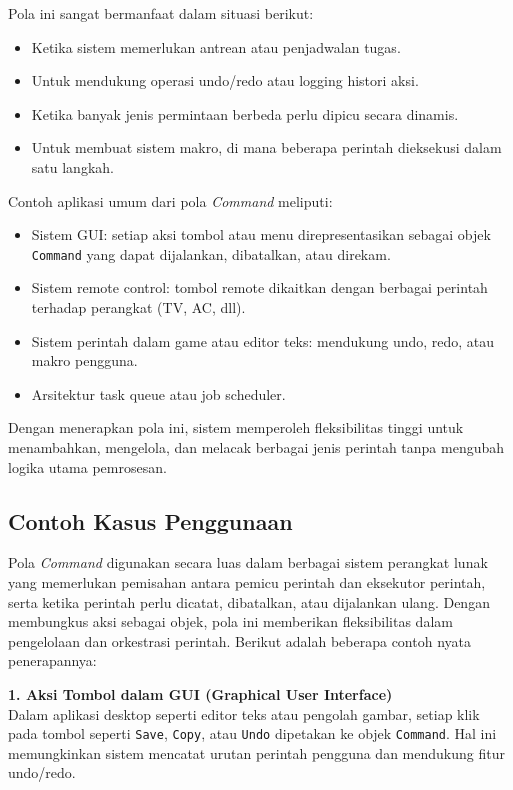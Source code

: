 Pola ini sangat bermanfaat dalam situasi berikut:
\begin{itemize}
	\item Ketika sistem memerlukan antrean atau penjadwalan tugas.
	\item Untuk mendukung operasi undo/redo atau logging histori aksi.
	\item Ketika banyak jenis permintaan berbeda perlu dipicu secara dinamis.
	\item Untuk membuat sistem makro, di mana beberapa perintah dieksekusi dalam satu langkah.
\end{itemize}

Contoh aplikasi umum dari pola \textit{Command} meliputi:
\begin{itemize}
	\item Sistem GUI: setiap aksi tombol atau menu direpresentasikan sebagai objek \texttt{Command} yang dapat dijalankan, dibatalkan, atau direkam.
	\item Sistem remote control: tombol remote dikaitkan dengan berbagai perintah terhadap perangkat (TV, AC, dll).
	\item Sistem perintah dalam game atau editor teks: mendukung undo, redo, atau makro pengguna.
	\item Arsitektur task queue atau job scheduler.
\end{itemize}

Dengan menerapkan pola ini, sistem memperoleh fleksibilitas tinggi untuk menambahkan, mengelola, dan melacak berbagai jenis perintah tanpa mengubah logika utama pemrosesan.

\subsection{Contoh Kasus Penggunaan}

Pola \textit{Command} digunakan secara luas dalam berbagai sistem perangkat lunak yang memerlukan pemisahan antara pemicu perintah dan eksekutor perintah, serta ketika perintah perlu dicatat, dibatalkan, atau dijalankan ulang. Dengan membungkus aksi sebagai objek, pola ini memberikan fleksibilitas dalam pengelolaan dan orkestrasi perintah. Berikut adalah beberapa contoh nyata penerapannya:

\textbf{1. Aksi Tombol dalam GUI (Graphical User Interface)} \\
Dalam aplikasi desktop seperti editor teks atau pengolah gambar, setiap klik pada tombol seperti \texttt{Save}, \texttt{Copy}, atau \texttt{Undo} dipetakan ke objek \texttt{Command}. Hal ini memungkinkan sistem mencatat urutan perintah pengguna dan mendukung fitur undo/redo.


